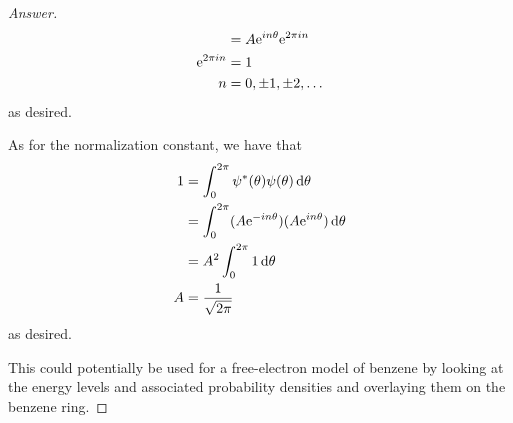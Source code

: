 \documentclass[../notes.tex]{subfiles}
\begin{document}
\begin{enumerate}[label={\textbf{3-\arabic*.}},ref={3-\arabic*}]
\begin{proof}[Answer]
\begin{align*}
            &= A\e[in\theta]\e[2\pi in]\\
            \e[2\pi in] &= 1\\
            n &= 0,\pm 1,\pm 2,\dots
        \end{align*}
        as desired.\par
        As for the normalization constant, we have that
        \begin{align*}
            1 &= \int_0^{2\pi}\psi^*(\theta)\psi(\theta)\dd{\theta}\\
            &= \int_0^{2\pi}(A\e[-in\theta])(A\e[in\theta])\dd{\theta}\\
            &= A^2\int_0^{2\pi}1\dd{\theta}\\
            A &= \frac{1}{\sqrt{2\pi}}
        \end{align*}
        as desired.\par
        This could potentially be used for a free-electron model of benzene by looking at the energy levels and associated probability densities and overlaying them on the benzene ring.
    \end{proof}
\end{enumerate}
\end{document}
